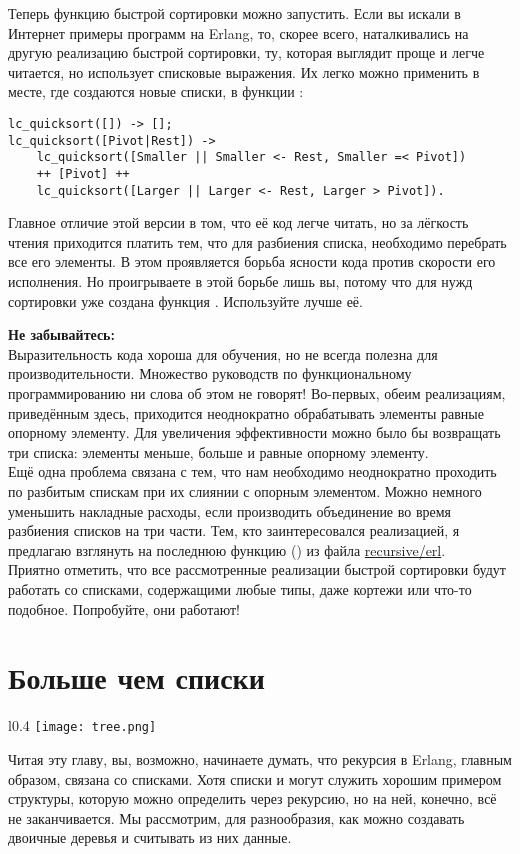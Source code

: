 Теперь функцию быстрой сортировки можно запустить.
Если вы искали в Интернет примеры программ на Erlang, то, скорее всего, наталкивались на другую реализацию быстрой сортировки, ту, которая выглядит проще и легче читается, но использует списковые выражения.
Их легко можно применить в месте, где создаются новые списки, в функции :
\begin{lstlisting}[style=erlang]
lc_quicksort([]) -> [];
lc_quicksort([Pivot|Rest]) ->
    lc_quicksort([Smaller || Smaller <- Rest, Smaller =< Pivot])
    ++ [Pivot] ++
    lc_quicksort([Larger || Larger <- Rest, Larger > Pivot]).
\end{lstlisting}

Главное отличие этой версии в том, что её код легче читать, но за лёгкость чтения приходится платить тем, что для разбиения списка, необходимо перебрать все его элементы.
В этом проявляется борьба ясности кода против скорости его исполнения.
Но проигрываете в этой борьбе лишь вы, потому что для нужд сортировки уже создана функция .
Используйте лучше её.\\
\colorbox{lorange}
{
    \begin{minipage}{1.0\linewidth}
\textbf{Не забывайтесь:}\\
Выразительность кода хороша для обучения, но не всегда полезна для производительности.
Множество руководств по функциональному программированию ни слова об этом не говорят!
Во\--первых, обеим реализациям, приведённым здесь, приходится неоднократно обрабатывать элементы равные опорному элементу.
Для увеличения эффективности можно было бы возвращать три списка: элементы меньше, больше и равные опорному элементу.\\
Ещё одна проблема связана с тем, что нам необходимо неоднократно проходить по разбитым спискам при их слиянии с опорным элементом.
Можно немного уменьшить накладные расходы, если производить объединение во время разбиения списков на три части.
Тем, кто заинтересовался реализацией, я предлагаю взглянуть на последнюю функцию () из файла \href{http://learnyousomeerlang.com/static/erlang/recursive.erl}{recursive/erl}.\\
Приятно отметить, что все рассмотренные реализации быстрой сортировки будут работать со списками, содержащими любые типы, даже кортежи или что\--то подобное.
Попробуйте, они работают!
    \end{minipage}
}
\section{Больше чем списки}
\label{more-than-lists}
\begin{wrapfigure}{l}{0.4\linewidth}
    \texttt{[image: tree.png]}
\end{wrapfigure}
Читая эту главу, вы, возможно, начинаете думать, что рекурсия в Erlang, главным образом, связана со списками.
Хотя списки и могут служить хорошим примером структуры, которую можно определить через рекурсию, но на ней, конечно, всё не заканчивается.
Мы рассмотрим, для разнообразия, как можно создавать двоичные деревья и считывать из них данные.

